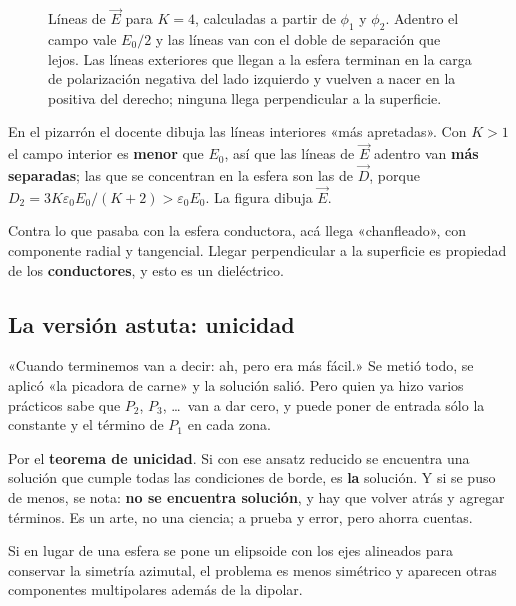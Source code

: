 \documentclass[12pt,a4paper]{article}
\begin{document}
\begin{figure}[H]
  \centering
  
  \caption{Líneas de $\vec E$ para $K=4$, calculadas a partir de $\phi_1$ y
  $\phi_2$. Adentro el campo vale $E_0/2$ y las líneas van con el doble de
  separación que lejos. Las líneas exteriores que llegan a la esfera terminan en
  la carga de polarización negativa del lado izquierdo y vuelven a nacer en la
  positiva del derecho; ninguna llega perpendicular a la superficie.}
\end{figure}

\begin{notebox}
En el pizarrón el docente dibuja las líneas interiores «más apretadas». Con $K>1$
el campo interior es \textbf{menor} que $E_0$, así que las líneas de $\vec E$
adentro van \textbf{más separadas}; las que se concentran en la esfera son las de
$\vec D$, porque $D_2 = 3K\varepsilon_0 E_0/(K+2) > \varepsilon_0 E_0$. La figura
dibuja $\vec E$.
\end{notebox}

\begin{warnbox}
Contra lo que pasaba con la esfera conductora, acá llega «chanfleado», con
componente radial y tangencial. Llegar perpendicular a la superficie es propiedad
de los \textbf{conductores}, y esto es un dieléctrico.
\end{warnbox}

\subsection{La versión astuta: unicidad}
\label{sec:astuta}

«Cuando terminemos van a decir: ah, pero era más fácil.» Se metió todo, se aplicó
«la picadora de carne» y la solución salió. Pero quien ya hizo varios prácticos
sabe que $P_2$, $P_3$, \ldots\ van a dar cero, y puede poner de entrada sólo la
constante y el término de $P_1$ en cada zona.

\begin{keybox}
Por el \textbf{teorema de unicidad}. Si con ese ansatz reducido se encuentra una
solución que cumple todas las condiciones de borde, es \textbf{la} solución. Y si
se puso de menos, se nota: \textbf{no se encuentra solución}, y hay que volver
atrás y agregar términos. Es un arte, no una ciencia; a prueba y error, pero
ahorra cuentas.
\end{keybox}

\begin{notebox}
Si en lugar de una esfera se pone un elipsoide con los ejes alineados para
conservar la simetría azimutal, el problema es menos simétrico y aparecen otras
componentes multipolares además de la dipolar.
\end{notebox}
\end{document}
